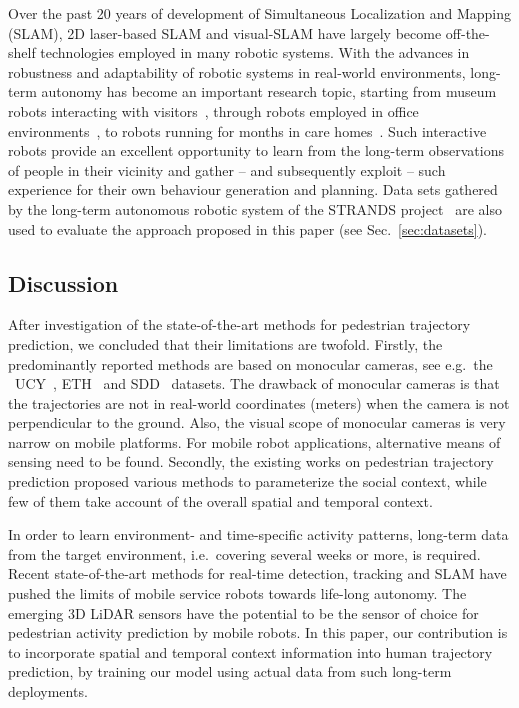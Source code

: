 \documentclass[letterpaper, 10 pt, conference]{ieeeconf}  %
\begin{document}
Over the past 20 years of development of Simultaneous Localization and Mapping (SLAM), 2D laser-based SLAM \cite{gmapping} and visual-SLAM \cite{mur2015orb,endres20143} have largely become off-the-shelf technologies employed in many robotic systems. 
With the advances in robustness and adaptability of robotic systems in real-world environments, long-term autonomy has become an important research topic, starting from museum robots interacting with visitors~\cite{Thrun1999MINERVA:Robot}, through robots employed in office environments~\cite{Biswas2016TheResults,Marder-Eppstein2010TheEnvironment}, to robots running for months in care homes~\cite{Hawes2016}. Such interactive robots provide an excellent opportunity to learn from the long-term observations of people in their vicinity and gather -- and subsequently exploit -- such experience for their own behaviour generation and planning. Data sets gathered by the long-term autonomous robotic system of the STRANDS project~\cite{Hawes2016,Hanheide2017} are also used to evaluate the approach proposed in this paper (see Sec.~\ref{sec:datasets}).

\subsection{Discussion}
After investigation of the state-of-the-art methods for pedestrian trajectory prediction, we concluded that their limitations are twofold.
Firstly, the predominantly reported methods are based on monocular cameras, see e.g.\ the \ UCY~\cite{UCY}, ETH~\cite{ETH} and SDD~\cite{SDD} datasets.
The drawback of monocular cameras is that the trajectories are not in real-world coordinates (meters) when the camera is not perpendicular to the ground.
Also, the visual scope of monocular cameras is very narrow on mobile platforms. For mobile robot applications, alternative means of sensing need to be found.
Secondly, the existing works on pedestrian trajectory prediction proposed various methods to parameterize the social context, while few of them take account of the overall spatial and temporal context. 


In order to learn environment- and time-specific activity patterns, long-term data from the target environment, i.e.\ covering several weeks or more, is required. Recent state-of-the-art methods for real-time detection, tracking and SLAM have pushed the limits of mobile service robots towards life-long autonomy. The emerging 3D LiDAR sensors have the potential to be the sensor of choice for pedestrian activity prediction by mobile robots. In this paper, our contribution is to incorporate spatial and temporal context information into human trajectory prediction, by training our model using actual data from such long-term deployments.
\end{document}
